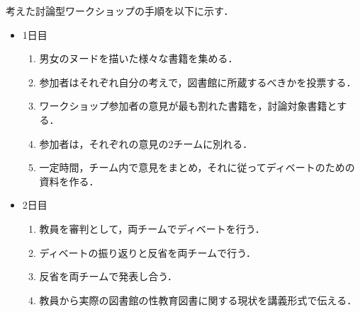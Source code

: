 \documentclass[uplatex,a4paper]{jsarticle}
\begin{document}
考えた討論型ワークショップの手順を以下に示す．
\begin{itemize}
    \item 1日目
    \begin{enumerate}
        \item 男女のヌードを描いた様々な書籍を集める．
        \item 参加者はそれぞれ自分の考えで，図書館に所蔵するべきかを投票する．
        \item ワークショップ参加者の意見が最も割れた書籍を，討論対象書籍とする．
        \item 参加者は，それぞれの意見の2チームに別れる．
        \item 一定時間，チーム内で意見をまとめ，それに従ってディベートのための資料を作る．
    \end{enumerate}
    \item 2日目
    \begin{enumerate}
        \item 教員を審判として，両チームでディベートを行う．
        \item ディベートの振り返りと反省を両チームで行う．
        \item 反省を両チームで発表し合う．
        \item 教員から実際の図書館の性教育図書に関する現状を講義形式で伝える．
    \end{enumerate}
\end{itemize}
\end{document}

